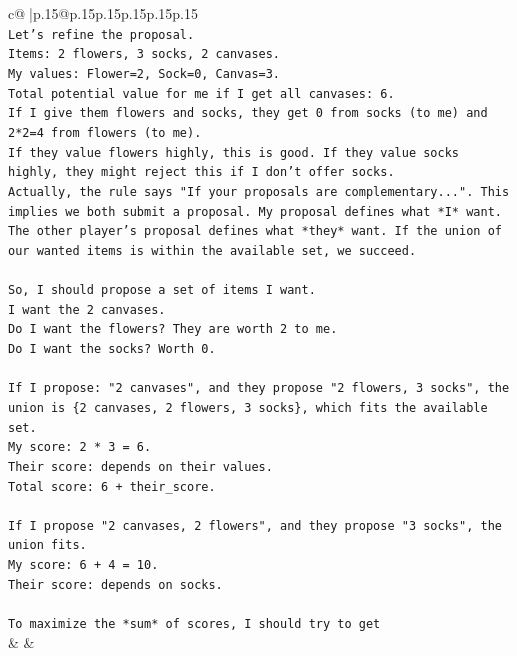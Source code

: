 \documentclass{article}
\begin{document}
{\begin{supertabular}{c@{$\;$}|p{.15\linewidth}@{}p{.15\linewidth}p{.15\linewidth}p{.15\linewidth}p{.15\linewidth}p{.15\linewidth}}
{{{\\ 
\texttt{Let's refine the proposal.} \\
\texttt{Items: 2 flowers, 3 socks, 2 canvases.} \\
\texttt{My values: Flower=2, Sock=0, Canvas=3.} \\
\texttt{Total potential value for me if I get all canvases: 6.} \\
\texttt{If I give them flowers and socks, they get 0 from socks (to me) and 2*2=4 from flowers (to me).} \\
\texttt{If they value flowers highly, this is good. If they value socks highly, they might reject this if I don't offer socks.} \\
\texttt{Actually, the rule says "If your proposals are complementary...". This implies we both submit a proposal. My proposal defines what *I* want. The other player's proposal defines what *they* want. If the union of our wanted items is within the available set, we succeed.} \\
\\ 
\texttt{So, I should propose a set of items I want.} \\
\texttt{I want the 2 canvases.} \\
\texttt{Do I want the flowers? They are worth 2 to me.} \\
\texttt{Do I want the socks? Worth 0.} \\
\\ 
\texttt{If I propose: "2 canvases", and they propose "2 flowers, 3 socks", the union is \{2 canvases, 2 flowers, 3 socks\}, which fits the available set.} \\
\texttt{My score: 2 * 3 = 6.} \\
\texttt{Their score: depends on their values.} \\
\texttt{Total score: 6 + their\_score.} \\
\\ 
\texttt{If I propose "2 canvases, 2 flowers", and they propose "3 socks", the union fits.} \\
\texttt{My score: 6 + 4 = 10.} \\
\texttt{Their score: depends on socks.} \\
\\ 
\texttt{To maximize the *sum* of scores, I should try to get} \\
            }
        }
    }
    & & \\ \\


\end{supertabular}}
\end{document}
